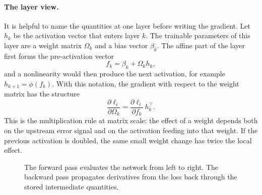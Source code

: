\paragraph{The layer view.}
It is helpful to name the quantities at one layer before writing the gradient.
Let $h_k$ be the activation vector that enters layer $k$. The trainable
parameters of this layer are a weight matrix $\Omega_k$ and a bias vector
$\beta_k$. The affine part of the layer first forms the pre-activation vector
\begin{equation}
  f_k = \beta_k + \Omega_k h_k,
\end{equation}
\noindent
and a nonlinearity would then produce the next activation, for example
$h_{k+1}=\phi(f_k)$. With this notation, the gradient with respect to the weight
matrix has the structure
\begin{equation}
  \frac{\partial \ell_i}{\partial \Omega_k}
  =
  \frac{\partial \ell_i}{\partial f_k}\,h_k^\top .
\end{equation}
\noindent
This is the multiplication rule at matrix scale: the effect of a weight depends
both on the upstream error signal and on the activation feeding into that
weight. If the previous activation is doubled, the same small weight change has
twice the local effect.

\begin{figure}[ht]
  \centering
  \caption{The forward pass evaluates the network from left to right. The
  backward pass propagates derivatives from the loss back through the stored
  intermediate quantities.}
\end{figure}

